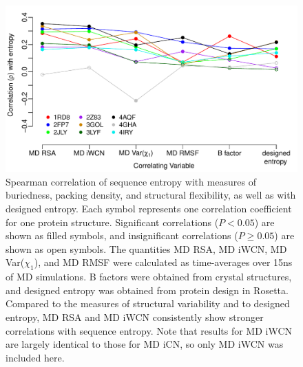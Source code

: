 \documentclass[smallextended]{svjour3}
\begin{document}
\begin{figure}[tbh]
\begin{center}
    \includegraphics[width=5in]{cor_entropy_all.pdf}
\end{center}
\caption{Spearman correlation of sequence entropy with measures of buriedness, packing density, and structural flexibility, as well as with designed entropy. Each symbol represents one correlation coefficient for one protein structure. Significant correlations ($P<0.05$) are shown as filled symbols, and insignificant correlations ($P\geq0.05$) are shown as open symbols. The quantities MD RSA, MD iWCN, MD Var($\chi_1$), and MD RMSF were calculated as time-averages over 15ns of MD simulations. B factors were obtained from crystal structures, and designed entropy was obtained from protein design in Rosetta. Compared to the measures of structural variability and to designed entropy, MD RSA and MD iWCN consistently show stronger correlations with sequence entropy. Note that results for MD iWCN are largely identical to those for MD iCN, so only MD iWCN was included here.}
\label{fig:cor_entropy_all}
\end{figure}
\end{document}
